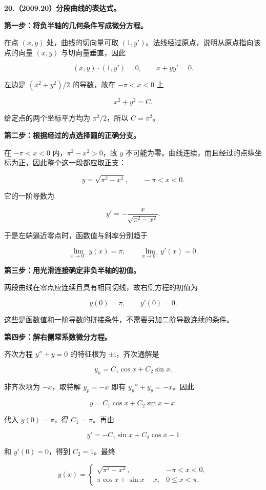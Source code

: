 \documentclass[UTF8,11pt,fontset=windows]{ctexart}
\begin{document}
\textbf{20.（2009.20）分段曲线的表达式。}

\textbf{第一步：将负半轴的几何条件写成微分方程。}

在点 $(x,y)$ 处，曲线的切向量可取 $(1,y')$。法线经过原点，说明从原点指向该点的向量 $(x,y)$ 与切向量垂直，因此

$$
(x,y)\cdot(1,y')=0,
\qquad x+yy'=0.
$$

左边是 $(x^2+y^2)/2$ 的导数，故在 $-\pi<x<0$ 上

$$
x^2+y^2=C.
$$

给定点的两个坐标平方均为 $\pi^2/2$，所以 $C=\pi^2$。

\textbf{第二步：根据经过的点选择圆的正确分支。}

在 $-\pi<x<0$ 内，$\pi^2-x^2>0$，故 $y$ 不可能为零。曲线连续，而且经过的点纵坐标为正，因此整个这一段都应取正支：

$$
y=\sqrt{\pi^2-x^2},\qquad-\pi<x<0.
$$

它的一阶导数为

$$
y'=-\frac{x}{\sqrt{\pi^2-x^2}}.
$$

于是左端逼近零点时，函数值与斜率分别趋于

$$
\lim_{x\to0^-}y(x)=\pi,
\qquad \lim_{x\to0^-}y'(x)=0.
$$

\textbf{第三步：用光滑连接确定非负半轴的初值。}

两段曲线在零点应连续且具有相同切线，故右侧方程的初值为

$$
y(0)=\pi,\qquad y'(0)=0.
$$

这些是函数值和一阶导数的拼接条件，不需要另加二阶导数连续的条件。

\textbf{第四步：解右侧常系数微分方程。}

齐次方程 $y''+y=0$ 的特征根为 $\pm\mathrm i$，齐次通解是

$$
y_h=C_1\cos x+C_2\sin x.
$$

非齐次项为 $-x$，取特解 $y_p=-x$ 即有 $y_p''+y_p=-x$。因此

$$
y=C_1\cos x+C_2\sin x-x.
$$

代入 $y(0)=\pi$，得 $C_1=\pi$。再由

$$
y'=-C_1\sin x+C_2\cos x-1
$$

和 $y'(0)=0$，得到 $C_2=1$。最终

$$
\boxed{y(x)=\begin{cases}
\sqrt{\pi^2-x^2},&-\pi<x<0,\\
\pi\cos x+\sin x-x,&0\le x<\pi.
\end{cases}}
$$
\end{document}
